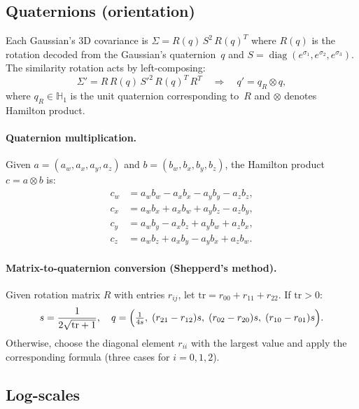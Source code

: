 \documentclass[11pt]{article}
\newcommand{\HQ}{\mathbb{H}}
\newcommand{\diag}{\operatorname{diag}}
\begin{document}
\subsection{Quaternions (orientation)}
\label{sec:quat-compose}

Each Gaussian's 3D covariance is $\Sigma = R(q)\,S^2\,R(q)^T$ where
$R(q)$ is the rotation decoded from the Gaussian's quaternion~$q$ and
$S = \diag(e^{\sigma_1}, e^{\sigma_2}, e^{\sigma_3})$. The similarity
rotation acts by left-composing:
\begin{equation}
  \Sigma' = R\,R(q)\,S'^2\,R(q)^T\,R^T
  \quad\Longrightarrow\quad
  q' = q_R \otimes q,
\end{equation}
where $q_R \in \HQ_1$ is the unit quaternion corresponding to~$R$ and
$\otimes$ denotes Hamilton product.

\paragraph{Quaternion multiplication.}
Given $a = (a_w, a_x, a_y, a_z)$ and $b = (b_w, b_x, b_y, b_z)$, the
Hamilton product $c = a \otimes b$ is:
\begin{align}
  c_w &= a_w b_w - a_x b_x - a_y b_y - a_z b_z, \\
  c_x &= a_w b_x + a_x b_w + a_y b_z - a_z b_y, \\
  c_y &= a_w b_y - a_x b_z + a_y b_w + a_z b_x, \\
  c_z &= a_w b_z + a_x b_y - a_y b_x + a_z b_w.
\end{align}

\paragraph{Matrix-to-quaternion conversion (Shepperd's method).}
Given rotation matrix $R$ with entries $r_{ij}$, let
$\mathrm{tr} = r_{00} + r_{11} + r_{22}$. If $\mathrm{tr} > 0$:
\begin{equation}
  s = \frac{1}{2\sqrt{\mathrm{tr}+1}}, \quad
  q = \Bigl(\tfrac{1}{4s},\;
  (r_{21}-r_{12})s,\;
  (r_{02}-r_{20})s,\;
  (r_{10}-r_{01})s\Bigr).
\end{equation}
Otherwise, choose the diagonal element $r_{ii}$ with the largest value and
apply the corresponding formula (three cases for $i = 0, 1, 2$).

\subsection{Log-scales}
\end{document}
